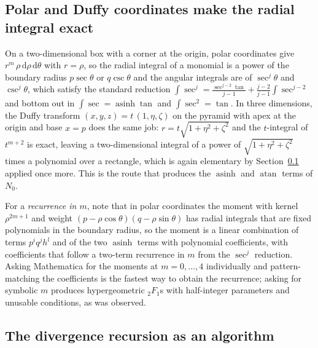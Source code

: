 \documentclass[11pt]{article}
\theoremstyle{remark}
\newcommand{\dd}{\mathrm{d}}
\newcommand{\asinh}{\operatorname{asinh}}
\newcommand{\atan}{\operatorname{atan}}
\begin{document}
\subsection{Polar and Duffy coordinates make the radial integral exact}
\label{sec:polar}

On a two-dimensional box with a corner at the origin, polar coordinates give
$r^{m}\,\rho\,\dd\rho\,\dd\theta$ with $r = \rho$, so the radial integral of a
monomial is a power of the boundary radius $p\sec\theta$ or $q\csc\theta$ and the
angular integrals are of $\sec^j\theta$ and $\csc^j\theta$, which satisfy the standard
reduction $\int\sec^j = \frac{\sec^{j-2}\tan}{j-1} + \frac{j-2}{j-1}\int\sec^{j-2}$
and bottom out in $\int\sec = \asinh\tan$ and $\int\sec^2 = \tan$. In three
dimensions, the Duffy transform $(x,y,z) = t\,(1, \eta, \zeta)$ on the pyramid with
apex at the origin and base $x = p$ does the same job: $r = t\sqrt{1+\eta^2+\zeta^2}$
and the $t$-integral of $t^{m+2}$ is exact, leaving a two-dimensional integral of a
power of $\sqrt{1+\eta^2+\zeta^2}$ times a polynomial over a rectangle, which is again
elementary by Section~\ref{sec:polar} applied once more. This is the route that
produces the $\asinh$ and $\atan$ terms of $N_0$.

For a \emph{recurrence in $m$}, note that in polar coordinates the moment with kernel
$\rho^{2m+1}$ and weight $(p-\rho\cos\theta)(q-\rho\sin\theta)$ has radial integrals
that are fixed polynomials in the boundary radius, so the moment is a linear
combination of terms $p^{i}q^{j}h^{l}$ and of the two $\asinh$ terms with polynomial
coefficients, with coefficients that follow a two-term recurrence in $m$ from the
$\sec^j$ reduction. Asking Mathematica for the moments at $m = 0,\ldots,4$
individually and pattern-matching the coefficients is the fastest way to obtain the
recurrence; asking for symbolic $m$ produces hypergeometric ${}_2F_1$s with
half-integer parameters and unusable conditions, as was observed.

\subsection{The divergence recursion as an algorithm}
\label{sec:divalg}
\end{document}
